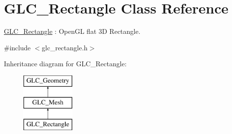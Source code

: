 \hypertarget{class_g_l_c___rectangle}{\section{G\-L\-C\-\_\-\-Rectangle Class Reference}
\label{class_g_l_c___rectangle}
}


\hyperlink{class_g_l_c___rectangle}{G\-L\-C\-\_\-\-Rectangle} \-: Open\-G\-L flat 3\-D Rectangle.  




{\ttfamily \#include $<$glc\-\_\-rectangle.\-h$>$}

Inheritance diagram for G\-L\-C\-\_\-\-Rectangle\-:\begin{figure}[H]
\begin{center}
\leavevmode
\includegraphics[height=3.000000cm]{class_g_l_c___rectangle}
\end{center}
\end{figure}
